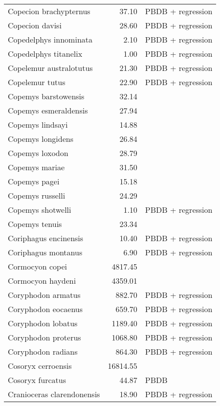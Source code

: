\begin{table}[ht]
\begin{tabular}{lrl}
  Copecion brachypternus & 37.10 & PBDB + regression \\ 
  Copecion davisi & 28.60 & PBDB + regression \\ 
  Copedelphys innominata & 2.10 & PBDB + regression \\ 
  Copedelphys titanelix & 1.00 & PBDB + regression \\ 
  Copelemur australotutus & 21.30 & PBDB + regression \\ 
  Copelemur tutus & 22.90 & PBDB + regression \\ 
  Copemys barstowensis & 32.14 & \cite{Tomiya2013} \\ 
  Copemys esmeraldensis & 27.94 & \cite{Tomiya2013} \\ 
  Copemys lindsayi & 14.88 & \cite{Tomiya2013} \\ 
  Copemys longidens & 26.84 & \cite{Tomiya2013} \\ 
  Copemys loxodon & 28.79 & \cite{Tomiya2013} \\ 
  Copemys mariae & 31.50 & \cite{Tomiya2013} \\ 
  Copemys pagei & 15.18 & \cite{Tomiya2013} \\ 
  Copemys russelli & 24.29 & \cite{Tomiya2013} \\ 
  Copemys shotwelli & 1.10 & PBDB + regression \\ 
  Copemys tenuis & 23.34 & \cite{Tomiya2013} \\ 
  Coriphagus encinensis & 10.40 & PBDB + regression \\ 
  Coriphagus montanus & 6.90 & PBDB + regression \\ 
  Cormocyon copei & 4817.45 & \cite{Tomiya2013} \\ 
  Cormocyon haydeni & 4359.01 & \cite{Tomiya2013} \\ 
  Coryphodon armatus & 882.70 & PBDB + regression \\ 
  Coryphodon eocaenus & 659.70 & PBDB + regression \\ 
  Coryphodon lobatus & 1189.40 & PBDB + regression \\ 
  Coryphodon proterus & 1068.80 & PBDB + regression \\ 
  Coryphodon radians & 864.30 & PBDB + regression \\ 
  Cosoryx cerroensis & 16814.55 & \cite{Tomiya2013} \\ 
  Cosoryx furcatus & 44.87 & PBDB \\ 
  Cranioceras clarendonensis & 18.90 & PBDB + regression \\ 

\end{tabular}
\end{table}
